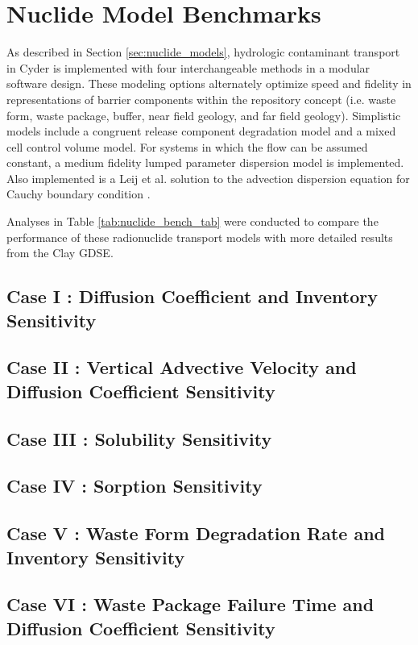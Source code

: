 \section{Nuclide Model Benchmarks}\label{sec:nuclide_benchmarks}

As described in Section \ref{sec:nuclide_models}, hydrologic contaminant 
transport in Cyder is implemented with four interchangeable  methods in a 
modular software design. These modeling options alternately optimize speed and 
fidelity in representations of barrier components within the repository concept 
(i.e. waste form, waste package, buffer, near field geology, and far field 
geology)\cite{huff_hydrologic_2013}.  Simplistic models include a congruent 
release component degradation model and a mixed cell control volume model. For 
systems in which the flow can be assumed constant, a medium fidelity lumped 
parameter dispersion model is implemented. Also implemented is a Leij et al. 
solution to the advection dispersion equation for Cauchy boundary condition 
\cite{leij_analytical_1991, van_genuchten_analytical_1982}.  

Analyses in Table \ref{tab:nuclide_bench_tab} were conducted to compare the 
performance of these radionuclide transport models with more detailed results from the 
Clay \gls{GDSE}. 




\subsection{Case I : Diffusion Coefficient and Inventory Sensitivity}
\subsection{Case II : Vertical Advective Velocity and Diffusion Coefficient Sensitivity}
\subsection{Case III : Solubility Sensitivity}
\subsection{Case IV : Sorption Sensitivity}
\subsection{Case V : Waste Form Degradation Rate and Inventory Sensitivity}
\subsection{Case VI : Waste Package Failure Time and Diffusion Coefficient Sensitivity}
